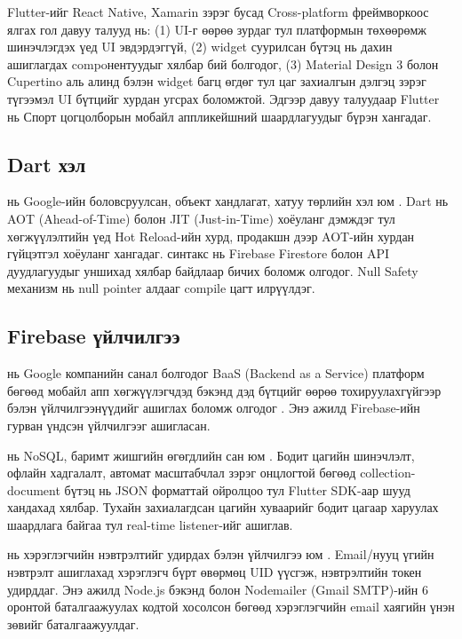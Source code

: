 Flutter-ийг React Native, Xamarin зэрэг бусад Cross-platform фреймворкоос ялгах гол давуу талууд нь: (1) UI-г өөрөө зурдаг тул платформын төхөөрөмж шинэчлэгдэх үед UI эвдэрдэггүй, (2) widget суурилсан бүтэц нь дахин ашиглагдах compoнентуудыг хялбар бий болгодог, (3) Material Design 3 болон Cupertino аль алинд бэлэн widget багц өгдөг тул цаг захиалгын дэлгэц зэрэг түгээмэл UI бүтцийг хурдан угсрах боломжтой. Эдгээр давуу талуудаар Flutter нь Спорт цогцолборын мобайл аппликейшний шаардлагуудыг бүрэн хангадаг.

\subsection*{Dart хэл}

 нь Google-ийн боловсруулсан, объект хандлагат, хатуу төрлийн хэл юм \cite{dart_doc}. Dart нь AOT (Ahead-of-Time) болон JIT (Just-in-Time) хоёуланг дэмждэг тул хөгжүүлэлтийн үед Hot Reload-ийн хурд, продакшн дээр AOT-ийн хурдан гүйцэтгэл хоёуланг хангадаг.  синтакс нь Firebase Firestore болон API дуудлагуудыг уншихад хялбар байдлаар бичих боломж олгодог. Null Safety механизм нь null pointer алдааг compile цагт илрүүлдэг.

\subsection*{Firebase үйлчилгээ}

 нь Google компанийн санал болгодог BaaS (Backend as a Service) платформ бөгөөд мобайл апп хөгжүүлэгчдэд бэкэнд дэд бүтцийг өөрөө тохируулахгүйгээр бэлэн үйлчилгээнүүдийг ашиглах боломж олгодог \cite{firebase_doc}. Энэ ажилд Firebase-ийн гурван үндсэн үйлчилгээг ашигласан.

 нь NoSQL, баримт жишгийн өгөгдлийн сан юм \cite{firestore_doc}. Бодит цагийн шинэчлэлт, офлайн хадгалалт, автомат масштабчлал зэрэг онцлогтой бөгөөд collection-document бүтэц нь JSON форматтай ойролцоо тул Flutter SDK-аар шууд хандахад хялбар. Тухайн захиалагдсан цагийн хуваарийг бодит цагаар харуулах шаардлага байгаа тул real-time listener-ийг ашиглав.

 нь хэрэглэгчийн нэвтрэлтийг удирдах бэлэн үйлчилгээ юм \cite{firebase_auth}. Email/нууц үгийн нэвтрэлт ашиглахад хэрэглэгч бүрт өвөрмөц UID үүсгэж, нэвтрэлтийн токен удирддаг. Энэ ажилд Node.js бэкэнд болон Nodemailer (Gmail SMTP)-ийн 6 оронтой баталгаажуулах кодтой хосолсон бөгөөд хэрэглэгчийн email хаягийн үнэн зөвийг баталгаажуулдаг.


